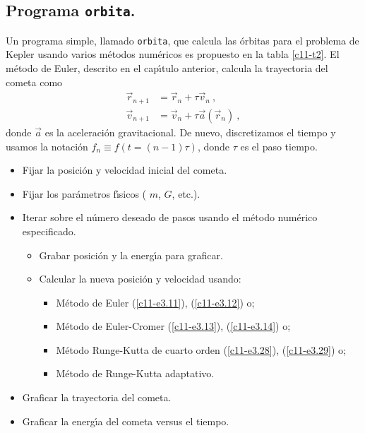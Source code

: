 \subsection{Programa {\tt orbita}.}

Un programa simple, llamado \verb|orbita|, que calcula las {\'o}rbitas
para el problema de Kepler usando varios m{\'e}todos num{\'e}ricos es
propuesto en la tabla \ref{c11-t2}. El m{\'e}todo de Euler, descrito en el
cap{\'\i}tulo anterior, calcula la trayectoria del cometa como
\begin{align}
\label{c11-e3.11}
\vec r_{n+1}&=\vec r_n+\tau \vec v_n \ ,\\
\label{c11-e3.12}
\vec v_{n+1}&=\vec v_n+\tau \vec a(\vec r_n) \ ,
\end{align}
donde $\vec a$ es la aceleraci{\'o}n gravitacional. De nuevo,
discretizamos el tiempo y usamos la notaci{\'o}n $f_{n}\equiv f(t=(n-1)\tau)$,
donde $\tau$ es el paso tiempo.
\begin{table}
\hrulefill
\begin{itemize}
\item Fijar la posici{\'o}n y velocidad inicial del cometa.
\item Fijar los par{\'a}metros f{\'\i}sicos ( $m$, $G$, etc.).
\item Iterar sobre el n{\'u}mero deseado de pasos usando el m{\'e}todo
  num{\'e}rico especificado.
  \begin{itemize}
  \item Grabar posici{\'o}n y la energ{\'\i}a para graficar.
    \item Calcular la nueva posici{\'o}n y velocidad usando:
      \begin{itemize}
        \item M{\'e}todo de Euler (\ref{c11-e3.11}), (\ref{c11-e3.12}) o;
        \item M{\'e}todo de Euler-Cromer (\ref{c11-e3.13}),
          (\ref{c11-e3.14}) o;
          \item M{\'e}todo Runge-Kutta de cuarto orden (\ref{c11-e3.28}),
            (\ref{c11-e3.29}) o;
          \item M{\'e}todo de Runge-Kutta adaptativo.
      \end{itemize}
\end{itemize}
\item Graficar la trayectoria del cometa.
\item Graficar la energ{\'\i}a del cometa versus el tiempo.
\end{itemize}
\hrulefill
\caption{Bosquejo del programa {\tt orbita}, el cual calcula la trayectoria
  de un cometa usando varios m{\'e}todos num{\'e}ricos.}\label{c11-t2}
\end{table}

